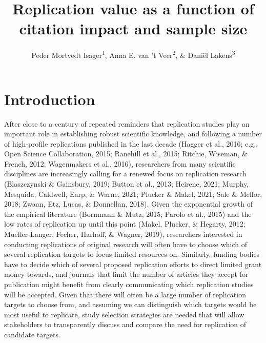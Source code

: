 \documentclass[
  english,
  man,floatsintext]{apa6}
\title{Replication value as a function of citation impact and sample size}
\author{Peder Mortvedt Isager\textsuperscript{1}, Anna E. van 't Veer\textsuperscript{2}, \& Daniël Lakens\textsuperscript{3}}
\date{}
\affiliation{\vspace{0.5cm}\textsuperscript{1} Department of Psychology, Oslo New University College\\\textsuperscript{2} Methodology and Statistics unit, Institute of Psychology, Leiden University\\\textsuperscript{3} Department of Industrial Engineering \& Innovation Sciences, Eindhoven University of Technology}
\begin{document}
\maketitle

\hypertarget{introduction}{%
\section{Introduction}\label{introduction}}

After close to a century of repeated reminders that replication studies play an important role in establishing robust scientific knowledge, and following a number of high-profile replications published in the last decade (Hagger et al., 2016; e.g., Open Science Collaboration, 2015; Ranehill et al., 2015; Ritchie, Wiseman, \& French, 2012; Wagenmakers et al., 2016), researchers from many scientific disciplines are increasingly calling for a renewed focus on replication research (Blaszczynski \& Gainsbury, 2019; Button et al., 2013; Heirene, 2021; Murphy, Mesquida, Caldwell, Earp, \& Warne, 2021; Plucker \& Makel, 2021; Sale \& Mellor, 2018; Zwaan, Etz, Lucas, \& Donnellan, 2018). Given the exponential growth of the empirical literature (Bornmann \& Mutz, 2015; Parolo et al., 2015) and the low rates of replication up until this point (Makel, Plucker, \& Hegarty, 2012; Mueller-Langer, Fecher, Harhoff, \& Wagner, 2019), researchers interested in conducting replications of original research will often have to choose which of several replication targets to focus limited resources on. Similarly, funding bodies have to decide which of several proposed replication efforts to direct limited grant money towards, and journals that limit the number of articles they accept for publication might benefit from clearly communicating which replication studies will be accepted. Given that there will often be a large number of replication targets to choose from, and assuming we can distinguish which targets would be most useful to replicate, study selection strategies are needed that will allow stakeholders to transparently discuss and compare the need for replication of candidate targets.
\end{document}
